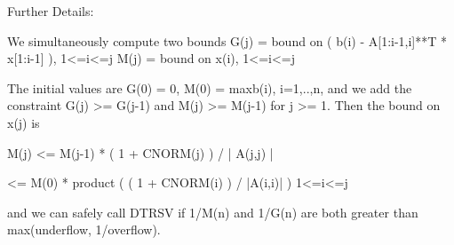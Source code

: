 \begin{DoxyParagraph}{Further Details\+: }
\begin{DoxyVerb}
  We simultaneously compute two bounds
       G(j) = bound on ( b(i) - A[1:i-1,i]**T * x[1:i-1] ), 1<=i<=j
       M(j) = bound on x(i), 1<=i<=j

  The initial values are G(0) = 0, M(0) = max{b(i), i=1,..,n}, and we
  add the constraint G(j) >= G(j-1) and M(j) >= M(j-1) for j >= 1.
  Then the bound on x(j) is

       M(j) <= M(j-1) * ( 1 + CNORM(j) ) / | A(j,j) |

            <= M(0) * product ( ( 1 + CNORM(i) ) / |A(i,i)| )
                      1<=i<=j

  and we can safely call DTRSV if 1/M(n) and 1/G(n) are both greater
  than max(underflow, 1/overflow).\end{DoxyVerb}
 
\end{DoxyParagraph}

